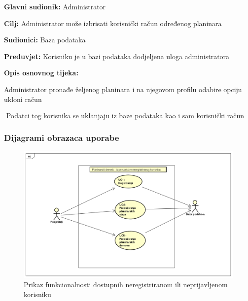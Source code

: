 		\noindent {}
		\begin{packed_item}
			
			\item \textbf{Glavni sudionik: }$ $Administrator$ $
			\item  \textbf{Cilj:} $ $Administrator može izbrisati korisnički račun određenog planinara $ $
			\item  \textbf{Sudionici:} $ $Baza podataka $ $
			\item  \textbf{Preduvjet:} $ $Korisniku je u bazi podataka dodjeljena uloga administratora$ $
			\item  \textbf{Opis osnovnog tijeka:}
			
			\item[] \begin{packed_enum}
				
				\item $ $Administrator pronađe željenog planinara i na njegovom profilu odabire opciju ukloni račun$ $
				\item $ $ Podatci tog korisnika se uklanjaju iz baze podataka kao i sam korisnički račun $ $
				
				
			\end{packed_enum}
		\end{packed_item}
	
		
		\subsubsection{Dijagrami obrazaca uporabe}
		
				\begin{figure}[H]
					\includegraphics[scale=0.5]{dijagrami/posjetitelj-funkcionalnosti.png} %
					\centering
					\caption{Prikaz funkcionalnosti dostupnih neregistriranom ili neprijavljenom korisniku}
					\label{fig:UC dijagrami}
				\end{figure}
		
